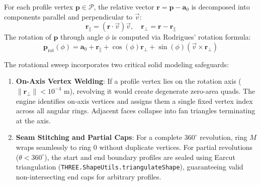 For each profile vertex $\mathbf{p} \in \mathcal{P}$, the relative vector $\mathbf{r} = \mathbf{p} - \mathbf{a}_0$ is decomposed into components parallel and perpendicular to $\vec{v}$:
\begin{equation}
\mathbf{r}_{\parallel} = (\mathbf{r} \cdot \vec{v}) \vec{v}, \quad \mathbf{r}_{\perp} = \mathbf{r} - \mathbf{r}_{\parallel}
\label{eq:revolve_decomp}
\end{equation}
The rotation of $\mathbf{p}$ through angle $\phi$ is computed via Rodrigues' rotation formula:
\begin{equation}
\mathbf{p}_{\text{rot}}(\phi) = \mathbf{a}_0 + \mathbf{r}_{\parallel} + \cos(\phi) \mathbf{r}_{\perp} + \sin(\phi) (\vec{v} \times \mathbf{r}_{\perp})
\label{eq:rodrigues}
\end{equation}

The rotational sweep incorporates two critical solid modeling safeguards:
\begin{enumerate}
    \item \textbf{On-Axis Vertex Welding}: If a profile vertex lies on the rotation axis ($\|\mathbf{r}_{\perp}\| < 10^{-4}\text{ m}$), revolving it would create degenerate zero-area quads. The engine identifies on-axis vertices and assigns them a single fixed vertex index across all angular rings. Adjacent faces collapse into fan triangles terminating at the axis.
    \item \textbf{Seam Stitching and Partial Caps}: For a complete $360^\circ$ revolution, ring $M$ wraps seamlessly to ring 0 without duplicate vertices. For partial revolutions ($\theta < 360^\circ$), the start and end boundary profiles are sealed using Earcut triangulation (\texttt{THREE.ShapeUtils.triangulateShape}), guaranteeing valid non-intersecting end caps for arbitrary profiles.
\end{enumerate}

